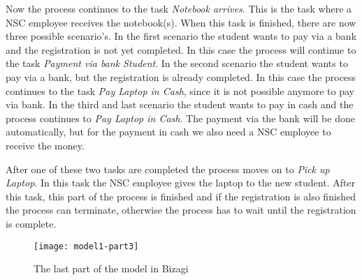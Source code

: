 Now the process continues to the task \emph{Notebook arrives}.
This is the task where a NSC employee receives the notebook(s).
When this task is finished, there are now three possible scenario's.
In the first scenario the student wants to pay via a bank and the registration is not yet completed.
In this case the process will continue to the task \emph{Payment via bank Student}.
In the second scenario the student wants to pay via a bank, but the registration is already completed.
In this case the process continues to the task \emph{Pay Laptop in Cash}, since it is not possible anymore to pay via bank.
In the third and last scenario the student wants to pay in cash and the process continues to \emph{Pay Laptop in Cash}.
The payment via the bank will be done automatically, but for the payment in cash we also need a NSC employee to receive the money.

After one of these two tasks are completed the process moves on to \emph{Pick up Laptop}.
In this task the NSC employee gives the laptop to the new student.
After this task, this part of the process is finished and if the registration is also finished the process can terminate, otherwise the process has to wait until the registration is complete.

\begin{figure}[H]
	\centering
	\texttt{[image: model1-part3]}
	\caption{The last part of the model in Bizagi}
	\label{fig:model1-part3}
\end{figure}
